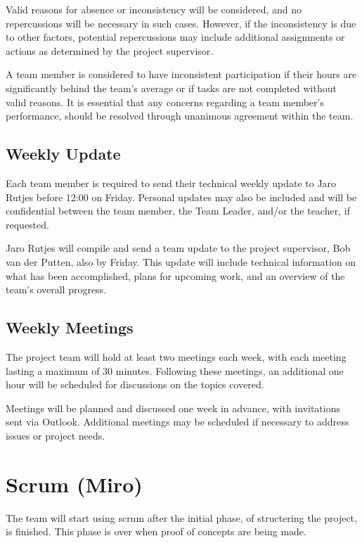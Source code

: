 \documentclass{projdoc}
\begin{document}
Valid reasons for absence or inconsistency will be considered, and no repercussions
will be necessary in such cases. However, if the inconsistency is due to other
factors, potential repercussions may include additional assignments or actions as
determined by the project supervisor.

A team member is considered to have inconsistent participation if their hours 
are significantly behind the team’s average or if tasks are not completed 
without valid reasons. It is essential that any concerns regarding a team 
member's performance, should be resolved through unanimous agreement within the team.

\subsection{Weekly Update}

Each team member is required to send their technical weekly update to Jaro Rutjes
before 12:00 on Friday. Personal updates may also be included and will be
confidential between the team member, the Team Leader, and/or the teacher, if
requested.

Jaro Rutjes will compile and send a team update to the project supervisor, Bob 
van der Putten, also by Friday. This update will include technical information 
on what has been accomplished, plans for upcoming work, and an overview of the 
team's overall progress.

\subsection{Weekly Meetings}

The project team will hold at least two meetings each week, with each meeting lasting
a maximum of 30 minutes. Following these meetings, an additional one hour will be
scheduled for discussions on the topics covered.

Meetings will be planned and discussed one week in advance, with invitations sent via
Outlook. Additional meetings may be scheduled if necessary to address issues or
project needs.

\section{Scrum (Miro)}

The team will start using scrum after the initial phase, of structering the project,
is finished. This phase is over when proof of concepts are being made.
\end{document}

